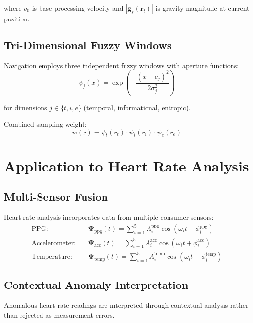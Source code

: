 \documentclass[12pt,a4paper]{article}
\begin{document}
where $v_0$ is base processing velocity and $|\mathbf{g}_s(\mathbf{r}_t)|$ is gravity magnitude at current position.

\subsection{Tri-Dimensional Fuzzy Windows}

Navigation employs three independent fuzzy windows with aperture functions:
\begin{equation}
\psi_j(x) = \exp\left(-\frac{(x - c_j)^2}{2\sigma_j^2}\right)
\end{equation}

for dimensions $j \in \{t, i, e\}$ (temporal, informational, entropic).

Combined sampling weight:
\begin{equation}
w(\mathbf{r}) = \psi_t(r_t) \cdot \psi_i(r_i) \cdot \psi_e(r_e)
\end{equation}

\section{Application to Heart Rate Analysis}

\subsection{Multi-Sensor Fusion}

Heart rate analysis incorporates data from multiple consumer sensors:
\begin{align}
\text{PPG}: \quad &\mathbf{\Psi}_{\text{ppg}}(t) = \sum_{i=1}^{5} A_i^{\text{ppg}} \cos(\omega_i t + \phi_i^{\text{ppg}}) \\
\text{Accelerometer}: \quad &\mathbf{\Psi}_{\text{acc}}(t) = \sum_{i=1}^{5} A_i^{\text{acc}} \cos(\omega_i t + \phi_i^{\text{acc}}) \\
\text{Temperature}: \quad &\mathbf{\Psi}_{\text{temp}}(t) = \sum_{i=1}^{5} A_i^{\text{temp}} \cos(\omega_i t + \phi_i^{\text{temp}})
\end{align}

\subsection{Contextual Anomaly Interpretation}

Anomalous heart rate readings are interpreted through contextual analysis rather than rejected as measurement errors.
\end{document}
